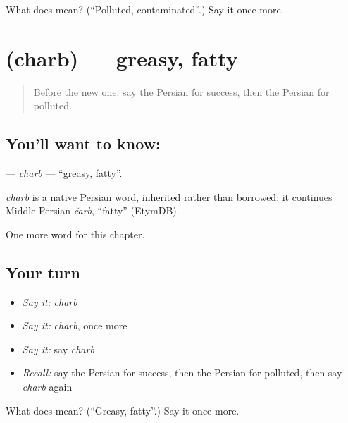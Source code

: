 \begin{tcolorbox}[breakable,colback=teal!4,colframe=teal!35!black,title={Before you move on}]
What does  mean? (\textquotedblleft{}Polluted, contaminated\textquotedblright{}.) Say it once more.
\end{tcolorbox}
\section[\texorpdfstring{\fa{چرب} (charb)}{چرب (charb)}]{ (charb) — greasy, fatty}

\label{lesson:FA-C199-charb}



\begin{quote}
Before the new one: say the Persian for success, then the Persian for polluted.
\end{quote}

\subsection*{You'll want to know: }
\textbf{} — \emph{charb} — \textquotedblleft{}greasy, fatty\textquotedblright{}.

\begin{cousinweb}
\emph{charb} is a native Persian word, inherited rather than borrowed: it continues Middle Persian \emph{čarb}, \textquotedblleft{}fatty\textquotedblright{} (EtymDB).
\end{cousinweb}

\begin{grammarlens}[title={What you've built}]
One more word for this chapter.
\end{grammarlens}

\subsection*{Your turn}
\begin{itemize}
\raggedright
  \item \emph{Say it:} \emph{charb}
  \item \emph{Say it:} \emph{charb}, once more
  \item \emph{Say it:} say \emph{charb}
  \item \emph{Recall:} say the Persian for success, then the Persian for polluted, then say \emph{charb} again
\end{itemize}

\begin{tcolorbox}[breakable,colback=teal!4,colframe=teal!35!black,title={Before you move on}]
What does  mean? (\textquotedblleft{}Greasy, fatty\textquotedblright{}.) Say it once more.
\end{tcolorbox}
